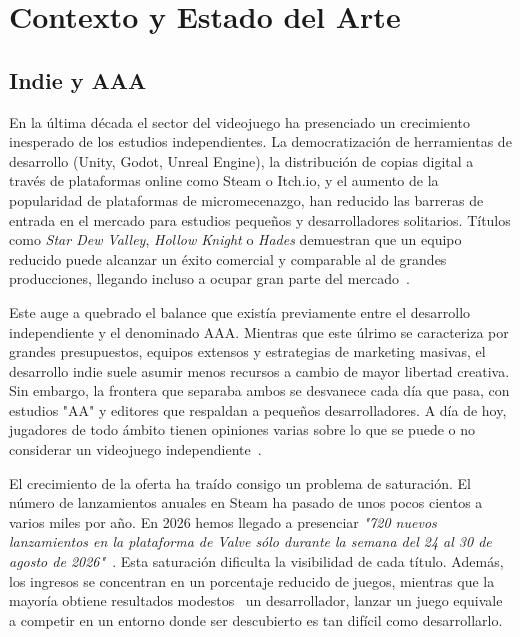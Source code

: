 \documentclass[11pt,a4paper,spanish]{book}
\numberwithin{equation}{chapter}
\numberwithin{figure}{chapter}
\begin{document}
\chapter{Contexto y Estado del Arte}

\section{Indie y AAA}
En la última década el sector del videojuego ha presenciado un 
crecimiento inesperado de los estudios independientes. La democratización
de herramientas de desarrollo (Unity, Godot, Unreal Engine), la distribución de 
copias digital a través de plataformas online como Steam o Itch.io, y el 
aumento de la popularidad de plataformas de micromecenazgo, han reducido las 
barreras de entrada en el mercado para estudios pequeños y desarrolladores 
solitarios. Títulos como \textit{Star Dew Valley}, \textit{Hollow Knight} o 
\textit{Hades} demuestran que un equipo reducido puede alcanzar un éxito comercial 
y comparable al de grandes producciones, llegando incluso a ocupar gran 
parte del mercado~\cite{informe_mercado_2024}.

\vspace{1em}
Este auge a quebrado el balance que existía previamente entre el desarrollo 
independiente y el denominado AAA. Mientras que este úlrimo se caracteriza por 
grandes presupuestos, equipos extensos y estrategias de marketing masivas, el 
desarrollo indie suele asumir menos recursos a cambio de mayor libertad creativa. 
Sin embargo, la frontera que separaba ambos se desvanece cada día que pasa, con 
estudios "AA" y editores que respaldan a pequeños desarrolladores. A día 
de hoy, jugadores de todo ámbito tienen opiniones varias sobre lo que se puede o 
no considerar un videojuego independiente~\cite{definicion_indie_jugon}.

\vspace{1em}
El crecimiento de la oferta ha traído consigo un problema de saturación. El 
número de lanzamientos anuales en Steam ha pasado de unos pocos cientos a varios 
miles por año. En 2026 hemos llegado a presenciar \textit{"720 nuevos lanzamientos 
en la plataforma de Valve sólo durante la semana del 24 al 30 de agosto de 
2026"}~\cite{aumento_lanzamientos_indie}. Esta saturación dificulta la 
visibilidad de cada título. Además, los ingresos se concentran en un porcentaje 
reducido de juegos, mientras que la mayoría obtiene resultados 
modestos~\cite{inf_mercado_2026} un desarrollador, lanzar un juego equivale a 
competir en un entorno donde ser descubierto es tan difícil como desarrollarlo.
\end{document}
